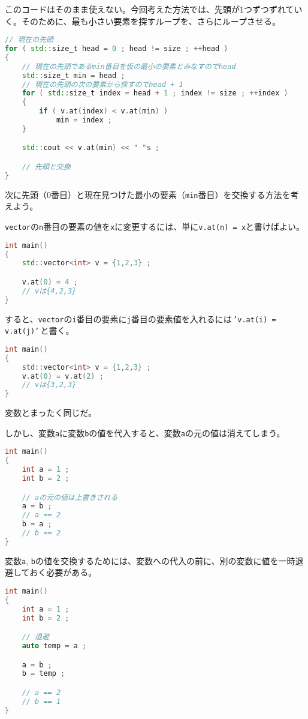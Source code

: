 このコードはそのまま使えない。今回考えた方法では、先頭が1つずつずれていく。そのために、最も小さい要素を探すループを、さらにループさせる。

\begin{lstlisting}[language={C++}]
// 現在の先頭
for ( std::size_t head = 0 ; head != size ; ++head )
{
    // 現在の先頭であるmin番目を仮の最小の要素とみなすのでhead
    std::size_t min = head ;    
    // 現在の先頭の次の要素から探すのでhead + 1
    for ( std::size_t index = head + 1 ; index != size ; ++index )
    {
        if ( v.at(index) < v.at(min) )
            min = index ;
    }

    std::cout << v.at(min) << " "s ;

    // 先頭と交換
}
\end{lstlisting}

次に先頭（0番目）と現在見つけた最小の要素（\texttt{min}番目）を交換する方法を考えよう。

\texttt{vector}の\texttt{n}番目の要素の値を\texttt{x}に変更するには、単に\texttt{v.at(n) = x}と書けばよい。

\ifTombow\pagebreak\fi
\begin{lstlisting}[language={C++}]
int main()
{
    std::vector<int> v = {1,2,3} ;

    v.at(0) = 4 ;
    // vは{4,2,3}
}
\end{lstlisting}

すると、\texttt{vector}の\texttt{i}番目の要素に\texttt{j}番目の要素値を入れるには\,\texttt{'v.at(i) = v.at(j)'}\,と書く。

\begin{lstlisting}[language={C++}]
int main()
{
    std::vector<int> v = {1,2,3} ;
    v.at(0) = v.at(2) ;
    // vは{3,2,3}
}
\end{lstlisting}

変数とまったく同じだ。

しかし、変数\texttt{a}に変数\texttt{b}の値を代入すると、変数\texttt{a}の元の値は消えてしまう。

\begin{lstlisting}[language={C++}]
int main()
{
    int a = 1 ;
    int b = 2 ;

    // aの元の値は上書きされる
    a = b ;
    // a == 2
    b = a ;
    // b == 2
}
\end{lstlisting}

変数\texttt{a}, \texttt{b}の値を交換するためには、変数への代入の前に、別の変数に値を一時退避しておく必要がある。

\begin{lstlisting}[language={C++}]
int main()
{
    int a = 1 ;
    int b = 2 ;

    // 退避
    auto temp = a ;

    a = b ;
    b = temp ;

    // a == 2
    // b == 1
}
\end{lstlisting}


